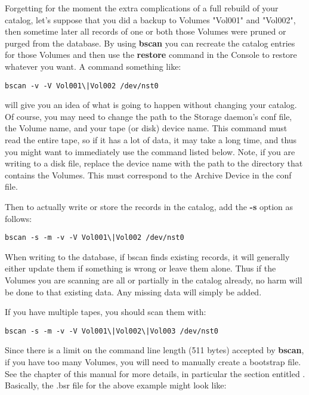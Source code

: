 Forgetting for the moment the extra complications of a full rebuild of
your catalog, let's suppose that you did a backup to Volumes "Vol001"
and "Vol002", then sometime later all records of one or both those
Volumes were pruned or purged from the
database. By using {\bf bscan} you can recreate the catalog entries for
those Volumes and then use the {\bf restore} command in the Console to restore
whatever you want. A command something like:

\footnotesize
\begin{verbatim}
bscan -v -V Vol001\|Vol002 /dev/nst0
\end{verbatim}
\normalsize

will give you an idea of what is going to happen without changing
your catalog. Of course, you may need to change the path to the Storage
daemon's conf file, the Volume name, and your tape (or disk) device name. This
command must read the entire tape, so if it has a lot of data, it may take a
long time, and thus you might want to immediately use the command listed
below. Note, if you are writing to a disk file, replace the device name with
the path to the directory that contains the Volumes. This must correspond to
the Archive Device in the conf file.

Then to actually write or store the records in the catalog, add the {\bf -s}
option as follows:

\footnotesize
\begin{verbatim}
bscan -s -m -v -V Vol001\|Vol002 /dev/nst0
\end{verbatim}
\normalsize

When writing to the database, if bscan finds existing records, it will
generally either update them if something is wrong or leave them alone. Thus
if the Volumes you are scanning are all or partially in the catalog already, no
harm will be done to that existing data. Any missing data will simply be
added.

If you have multiple tapes, you should scan them with:

\footnotesize
\begin{verbatim}
bscan -s -m -v -V Vol001\|Vol002\|Vol003 /dev/nst0
\end{verbatim}
\normalsize

Since there is a limit on the command line length (511 bytes) accepted
by {\bf bscan}, if you have too many Volumes, you will need to manually
create a bootstrap file.  See the 
chapter of this manual for more details, in particular the section
entitled . Basically, the
.bsr file for the above example might look like:

